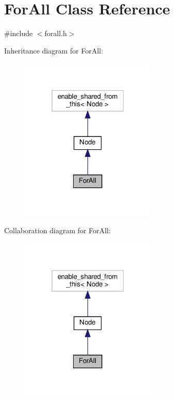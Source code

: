 \hypertarget{class_for_all}{}\section{For\+All Class Reference}
\label{class_for_all}


{\ttfamily \#include $<$forall.\+h$>$}



Inheritance diagram for For\+All\+:\nopagebreak
\begin{figure}[H]
\begin{center}
\leavevmode
\includegraphics[width=184pt]{d8/d15/class_for_all__inherit__graph}
\end{center}
\end{figure}


Collaboration diagram for For\+All\+:\nopagebreak
\begin{figure}[H]
\begin{center}
\leavevmode
\includegraphics[width=184pt]{df/da8/class_for_all__coll__graph}
\end{center}
\end{figure}
